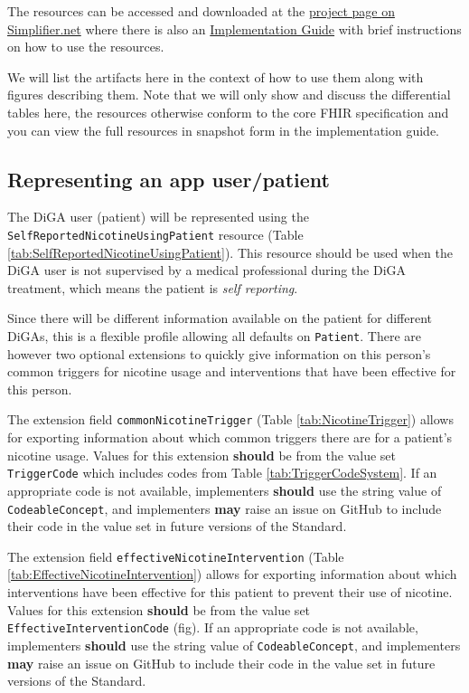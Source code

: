\documentclass[12px]{report}
\def\code#1{\texttt{#1}} %
\newcommand{\tabpatient}{}
\newcommand{\tabtriggerext}{}
\newcommand{\tabinterventionext}{}
\newcommand{\tabtriggercs}{}
\begin{document}
The resources can be accessed and downloaded at the \href{https://simplifier.net/treat-nicotine-usage-diga}{project page on Simplifier.net} where there is also an \href{https://simplifier.net/guide/self-reported-nicotine-usage-diga/home}{Implementation Guide} \cite{ig} with brief instructions on how to use the resources.

We will list the artifacts here in the context of how to use them along with figures describing them. Note that we will only show and discuss the differential tables here, the resources otherwise conform to the core FHIR specification and you can view the full resources in snapshot form in the implementation guide.

\subsection{Representing an app user/patient}
\tabpatient
The DiGA user (patient) will be represented using the \code{SelfReportedNicotineUsingPatient} resource (Table \ref{tab:SelfReportedNicotineUsingPatient}). This resource should be used when the DiGA user is not supervised by a medical professional during the DiGA treatment, which means the
patient is \textit{self reporting}.

Since there will be different information available on the patient for different DiGAs, this is a flexible profile allowing all defaults on \code{Patient}. 
There are however two optional extensions to quickly give information on this person's common triggers for nicotine usage and interventions that have been effective for this person.

\tabtriggerext
The extension field \code{commonNicotineTrigger} (Table \ref{tab:NicotineTrigger}) allows for exporting information about which common triggers there are for a patient's nicotine usage. 
Values for this extension \textbf{should} be from the value set \code{TriggerCode} which includes codes from Table \ref{tab:TriggerCodeSystem}. If an appropriate code is not available, implementers \textbf{should} use the string value of \code{CodeableConcept}, 
and implementers \textbf{may} raise an issue on GitHub \cite{github} to include their code in the value set in future versions of the Standard.

\tabtriggercs
\tabinterventionext

The extension field \code{effectiveNicotineIntervention} (Table \ref{tab:EffectiveNicotineIntervention}) allows for exporting information about which interventions have been effective for this patient to prevent their use of nicotine.
Values for this extension \textbf{should} be from the value set \code{EffectiveInterventionCode} (fig). If an appropriate code is not available, implementers \textbf{should} use the string value of \code{CodeableConcept}, 
and implementers \textbf{may} raise an issue on GitHub \cite{github} to include their code in the value set in future versions of the Standard.
\end{document}
